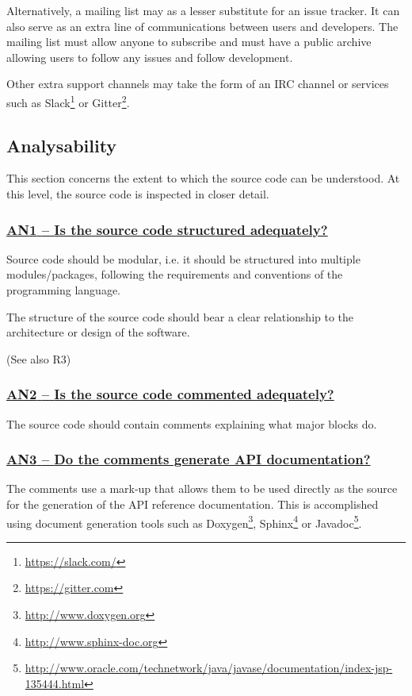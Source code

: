 \documentclass[a4paper,11pt]{article}
\newcommand{\indicator}[1]{\subsubsection*{\underline{#1}}}
\begin{document}
Alternatively, a mailing list may as a lesser substitute for an issue tracker.
It can also serve as an extra line of communications between users
and developers. The mailing list must allow anyone to subscribe and must have a
public archive allowing users to follow any issues and follow development.

Other extra support channels may take the form of an IRC channel or services
such as Slack\footnote{\url{https://slack.com/}} or
Gitter\footnote{\url{https://gitter.com}}.

\subsection{Analysability}\label{sec:ana}

This section concerns the extent to which the source code can be understood. At
this level, the source code is inspected in closer detail.

\newcommand{\anOneName}{AN1}
\newcommand{\anOneID}{\anOneName}
\newcommand{\anOneText}{Is the source code structured adequately?}
\indicator{\anOneName{ }--{ }\anOneText}\label{id:an1} 

Source code should be modular, i.e. it should be structured into multiple
modules/packages, following the requirements and conventions of the programming
language. 

The structure of the source code should bear a clear relationship to the
architecture or design of the software.

(See also R3)

\newcommand{\anTwoName}{AN2}
\newcommand{\anTwoID}{\anTwoName}
\newcommand{\anTwoText}{Is the source code commented adequately?}
\indicator{\anTwoName{ }--{ }\anTwoText}\label{id:an2} 

The source code should contain comments explaining what major blocks do.

\newcommand{\anThreeName}{AN3}
\newcommand{\anThreeID}{\anThreeName}
\newcommand{\anThreeText}{Do the comments generate API documentation?}
\indicator{\anThreeName{ }--{ }\anThreeText}\label{id:an3} 

The comments use a mark-up that allows them to be used directly as the
source for the generation of the API reference documentation. This is
%
%
%
accomplished using document generation tools such as Doxygen\footnote{\url{http://www.doxygen.org}}, Sphinx\footnote{\url{http://www.sphinx-doc.org}} or
Javadoc\footnote{\url{http://www.oracle.com/technetwork/java/javase/documentation/index-jsp-135444.html}}.
\end{document}
